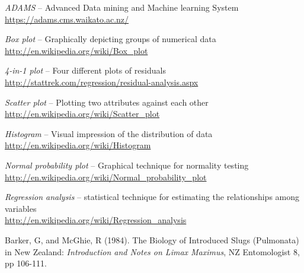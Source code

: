 %

\begin{thebibliography}{999}

		\textit{ADAMS} -- Advanced Data mining and Machine learning System \\
		\url{https://adams.cms.waikato.ac.nz/}{}
		
		\textit{Box plot} -- Graphically depicting groups of numerical data \\
		\url{http://en.wikipedia.org/wiki/Box_plot}{}
		
		\textit{4-in-1 plot} -- Four different plots of residuals \\
		\url{http://stattrek.com/regression/residual-analysis.aspx}{}
		
		\textit{Scatter plot} -- Plotting two attributes against each other \\
		\url{http://en.wikipedia.org/wiki/Scatter_plot}{}
		
		\textit{Histogram} -- Visual impression of the distribution of data \\
		\url{http://en.wikipedia.org/wiki/Histogram}{}
		
		\textit{Normal probability plot} -- Graphical technique for normality testing \\
		\url{http://en.wikipedia.org/wiki/Normal_probability_plot}{}
		
		\textit{Regression analysis} -- statistical technique for estimating the relationships among variables \\
		\url{http://en.wikipedia.org/wiki/Regression_analysis}{}
		
		Barker, G, and McGhie, R (1984). The Biology of Introduced Slugs (Pulmonata) 
		in New Zealand: \textit{Introduction and Notes on Limax Maximus}, 
		NZ Entomologist 8, pp 106-111.

\end{thebibliography}
